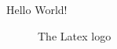 \documentclass{article}
\begin{document}
    Hello World!

    \begin{figure}[t]
        \centering
        
        \caption{The Latex logo~\cite{alejo2083_latex_2019}}
        \label{fig:actuators_section}
    \end{figure}

    
    
\end{document}
